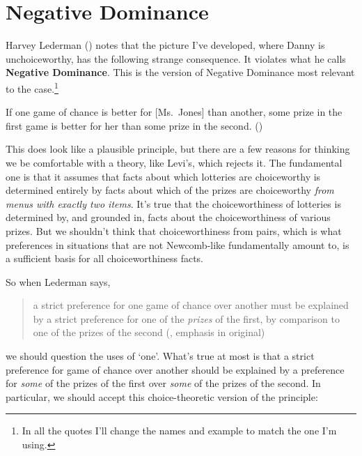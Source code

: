 \documentclass[
  11pt,
  letterpaper,
  DIV=11,
  numbers=noendperiod,
  twoside]{scrartcl}
\providecommand{\tightlist}{%
  \setlength{\itemsep}{0pt}\setlength{\parskip}{0pt}}
\begin{document}
\section{Negative Dominance}\label{sec-negdom}

Harvey Lederman () notes that
the picture I've developed, where Danny is unchoiceworthy, has the
following strange consequence. It violates what he calls
\textbf{Negative Dominance}. This is the version of Negative Dominance
most relevant to the case.\footnote{In all the quotes I'll change the
  names and example to match the one I'm using.}

\begin{description}
\tightlist
\item[Negative Dominance (Goodness)]
If one game of chance is better for {[}Ms.~Jones{]} than another, some
prize in the first game is better for her than some prize in the second.
()
\end{description}

This does look like a plausible principle, but there are a few reasons
for thinking we be comfortable with a theory, like Levi's, which rejects
it. The fundamental one is that it assumes that facts about which
lotteries are choiceworthy is determined entirely by facts about which
of the prizes are choiceworthy \emph{from menus with exactly two items}.
It's true that the choiceworthiness of lotteries is determined by, and
grounded in, facts about the choiceworthiness of various prizes. But we
shouldn't think that choiceworthiness from pairs, which is what
preferences in situations that are not Newcomb-like fundamentally amount
to, is a sufficient basis for all choiceworthiness facts.

So when Lederman says,

\begin{quote}
a strict preference for one game of chance over another must be
explained by a strict preference for one of the \emph{prizes} of the
first, by comparison to one of the prizes of the second
(, emphasis in
original)
\end{quote}

we should question the uses of `one'. What's true at most is that a
strict preference for game of chance over another should be explained by
a preference for \emph{some} of the prizes of the first over \emph{some}
of the prizes of the second. In particular, we should accept this
choice-theoretic version of the principle:
\end{document}
